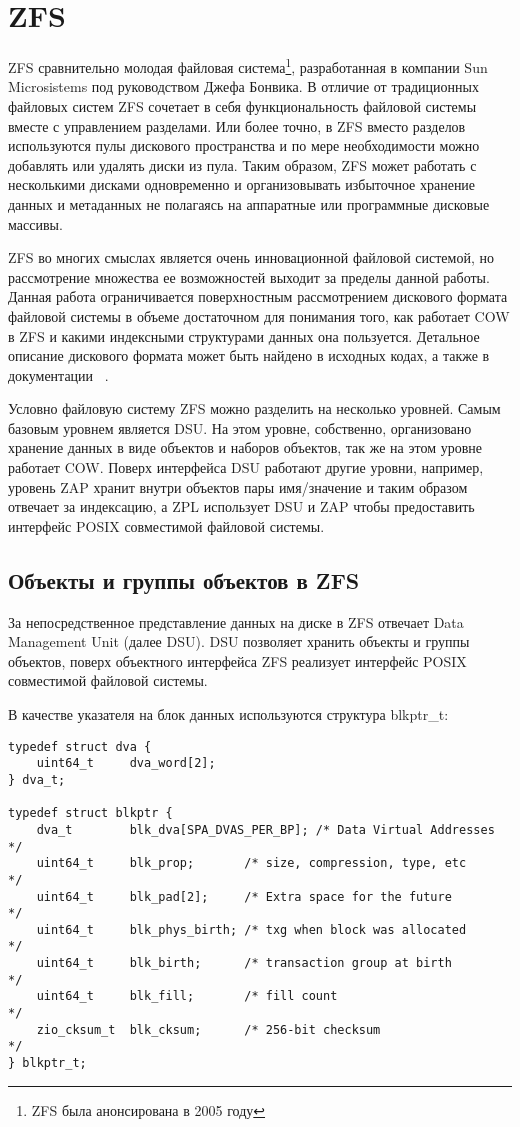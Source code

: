 \section{ZFS}

ZFS сравнительно молодая файловая система\footnote{ZFS была анонсирована в 2005
году}, разработанная в компании Sun Microsistems под руководством Джефа Бонвика.
В отличие от традиционных файловых систем ZFS сочетает в себя функциональность
файловой системы вместе с управлением разделами. Или более точно, в ZFS вместо
разделов используются пулы дискового пространства и по мере необходимости можно
добавлять или удалять диски из пула. Таким образом, ZFS может работать с
несколькими дисками одновременно и организовывать избыточное хранение данных и
метаданных не полагаясь на аппаратные или программные дисковые массивы.

ZFS во многих смыслах является очень инновационной файловой системой, но
рассмотрение множества ее возможностей выходит за пределы данной работы. Данная
работа ограничивается поверхностным рассмотрением дискового формата файловой
системы в объеме достаточном для понимания того, как работает COW в ZFS и какими
индексными структурами данных она пользуется. Детальное описание дискового
формата может быть найдено в исходных кодах, а также в документации
~\cite{ZFSSpec}.

Условно файловую систему ZFS можно разделить на несколько уровней. Самым базовым
уровнем является DSU. На этом уровне, собственно, организовано хранение данных в
виде объектов и наборов объектов, так же на этом уровне работает COW. Поверх
интерфейса DSU работают другие уровни, например, уровень ZAP хранит внутри
объектов пары имя/значение и таким образом отвечает за индексацию, а ZPL
использует DSU и ZAP чтобы предоставить интерфейс POSIX совместимой файловой
системы.

\subsection{Объекты и группы объектов в ZFS}

За непосредственное представление данных на диске в ZFS отвечает Data Management
Unit (далее DSU). DSU позволяет хранить объекты и группы объектов, поверх
объектного интерфейса ZFS реализует интерфейс POSIX совместимой файловой
системы.

В качестве указателя на блок данных используются структура blkptr\_t:
\begin{lstlisting}
typedef struct dva {
    uint64_t     dva_word[2];
} dva_t;

typedef struct blkptr {
    dva_t        blk_dva[SPA_DVAS_PER_BP]; /* Data Virtual Addresses */
    uint64_t     blk_prop;       /* size, compression, type, etc     */
    uint64_t     blk_pad[2];     /* Extra space for the future       */
    uint64_t     blk_phys_birth; /* txg when block was allocated     */
    uint64_t     blk_birth;      /* transaction group at birth       */
    uint64_t     blk_fill;       /* fill count                       */
    zio_cksum_t  blk_cksum;      /* 256-bit checksum                 */
} blkptr_t;
\end{lstlisting}

